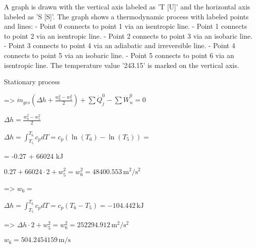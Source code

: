 A graph is drawn with the vertical axis labeled as 'T [U]' and the horizontal axis labeled as 'S [S]'. The graph shows a thermodynamic process with labeled points and lines:  
- Point 0 connects to point 1 via an isentropic line.  
- Point 1 connects to point 2 via an isentropic line.  
- Point 2 connects to point 3 via an isobaric line.  
- Point 3 connects to point 4 via an adiabatic and irreversible line.  
- Point 4 connects to point 5 via an isobaric line.  
- Point 5 connects to point 6 via an isentropic line.  
The temperature value '243.15' is marked on the vertical axis.

Stationary process  

=> \( \dot{m}_{ges} (\Delta h + \frac{w_6^2 - w_5^2}{2}) + \sum \dot{Q}_j^0 - \sum \dot{W}_n^0 = 0 \)  

\( \Delta h = \frac{w_0^2 - w_5^2}{2} \)  

\( \Delta h = \int_{T_5}^{T_6} c_p dT = c_p (\ln(T_6) - \ln(T_5)) = \)  

= -0.27 + 66024 kJ  

\( 0.27 + 66024 \cdot 2 + w_5^2 = w_6^2 = 48400.553 \, \text{m}^2/\text{s}^2 \)  

=> \( w_6 = \)  

\( \Delta h = \int_{T_5}^{T_6} c_p dT = c_p (T_6 - T_5) = -104.442 \, \text{kJ} \)  

=> \( \Delta h \cdot 2 + w_5^2 = w_6^2 = 252294.912 \, \text{m}^2/\text{s}^2 \)  

\( w_6 = 504.2454159 \, \text{m/s} \)